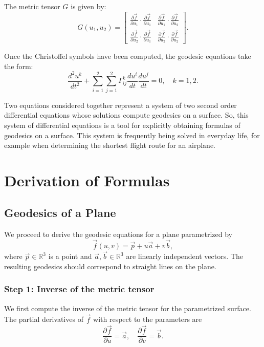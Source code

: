 \documentclass{article}
\begin{document}
	The metric tensor $G$ is given by:
	\[
	G(u_1, u_2) =
	\begin{bmatrix}
		\frac{\partial \vec{f}}{\partial u_1} \cdot \frac{\partial \vec{f}}{\partial u_1} &
		\frac{\partial \vec{f}}{\partial u_1} \cdot \frac{\partial \vec{f}}{\partial u_2} \\
		\frac{\partial \vec{f}}{\partial u_2} \cdot \frac{\partial \vec{f}}{\partial u_1} &
		\frac{\partial \vec{f}}{\partial u_2} \cdot \frac{\partial \vec{f}}{\partial u_2}
	\end{bmatrix}.
	\]

	
	Once the Christoffel symbols have been computed, the geodesic equations take the form:
	\[
	\frac{d^2 u^k}{dt^2} + \sum_{i=1}^{2} \sum_{j=1}^{2} \Gamma^k_{ij} \frac{du^i}{dt} \frac{du^j}{dt} = 0, \quad k = 1, 2.
	\]
	
	Two equations
	considered together represent a system of two second order differential equations whose solutions
	compute geodesics on a surface. So, this system of differential equations is a tool for explicitly
	obtaining formulas of geodesics on a surface. This system is frequently being solved in everyday life,
	for example when determining the shortest flight route for an airplane.

	\newpage
	\section{Derivation of Formulas}
	\subsection{Geodesics of a Plane}
	
	We proceed to derive the geodesic equations for a plane parametrized by
	\[
	\vec{f}(u, v) = \vec{p} + u\vec{a} + v\vec{b},
	\]
	where $\vec{p} \in \mathbb{R}^3$ is a point and $\vec{a}, \vec{b} \in \mathbb{R}^3$ are linearly independent vectors. The resulting geodesics should correspond to straight lines on the plane.
	
	\subsubsection{Step 1: Inverse of the metric tensor}
	
	We first compute the inverse of the metric tensor for the parametrized surface.\\
	
	The partial derivatives of $\vec{f}$ with respect to the parameters are
	\[
	\frac{\partial \vec{f}}{\partial u} = \vec{a}, \quad \frac{\partial \vec{f}}{\partial v} = \vec{b}.
	\]
	
\end{document}
